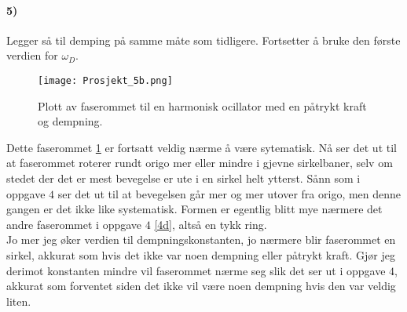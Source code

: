 \documentclass[11pt, A4paper,norsk]{article}
\begin{document}
		\paragraph{5)}
			\begin{flushleft}
Legger så til demping på samme måte som tidligere. Fortsetter å bruke den første verdien for $\omega_D$.
			\end{flushleft}
			\begin{figure}[H]
\texttt{[image: Prosjekt\_5b.png]}
\caption{Plott av faserommet til en harmonisk ocillator med en påtrykt kraft og dempning.}
\label{5b}
			\end{figure}
			\begin{flushleft}
Dette faserommet \ref{5b} er fortsatt veldig nærme å være sytematisk. Nå ser det ut til at faserommet roterer rundt origo mer eller mindre i gjevne sirkelbaner, selv om stedet der det er mest bevegelse er ute i en sirkel helt ytterst. Sånn som i oppgave $4$ ser det ut til at bevegelsen går mer og mer utover fra origo, men denne gangen er det ikke like systematisk. Formen er egentlig blitt mye nærmere det andre faserommet i oppgave $4$ \ref{4d}, altså en tykk ring. \\

Jo mer jeg øker verdien til dempningskonstanten, jo nærmere blir faserommet en sirkel, akkurat som hvis det ikke var noen dempning eller påtrykt kraft. Gjør jeg derimot konstanten mindre vil faserommet nærme seg slik det ser ut i oppgave $4$, akkurat som forventet siden det ikke vil være noen dempning hvis den var veldig liten.
			\end{flushleft}
\end{document}
